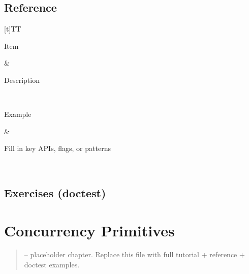 \documentclass[a4paper,11pt,english]{sphinxmanual}
\begin{document}
\subsection{Reference}
\label{\detokenize{stdlib/async_io:reference}}

\begin{savenotes}\sphinxattablestart
\sphinxthistablewithglobalstyle
\centering
\begin{tabulary}{\linewidth}[t]{TT}
\sphinxtoprule
\begin{varwidth}[t]{}
\sphinxstyletheadfamily \sphinxAtStartPar
Item
\sphinxbeforeendvarwidth
\end{varwidth}%
&\begin{varwidth}[t]{}
\sphinxstyletheadfamily \sphinxAtStartPar
Description
\sphinxbeforeendvarwidth
\end{varwidth}%
\\
\sphinxmidrule
\sphinxtableatstartofbodyhook\begin{varwidth}[t]{}
\sphinxAtStartPar
Example
\sphinxbeforeendvarwidth
\end{varwidth}%
&\begin{varwidth}[t]{}
\sphinxAtStartPar
Fill in key APIs, flags, or patterns
\sphinxbeforeendvarwidth
\end{varwidth}%
\\
\sphinxbottomrule
\end{tabulary}
\sphinxtableafterendhook\par
\sphinxattableend\end{savenotes}


\subsection{Exercises (doctest)}
\label{\detokenize{stdlib/async_io:exercises-doctest}}
\begin{sphinxVerbatim}[commandchars=\\\{\}]
\end{sphinxVerbatim}

\sphinxstepscope


\section{Concurrency Primitives}
\label{\detokenize{stdlib/concurrency_primitives:concurrency-primitives}}\label{\detokenize{stdlib/concurrency_primitives::doc}}\begin{quote}

\sphinxAtStartPar
{} – placeholder chapter. Replace this file with full tutorial + reference + doctest examples.
\end{quote}
\end{document}
